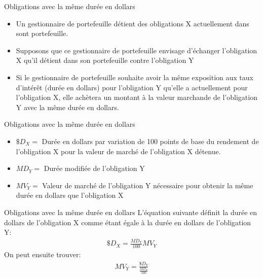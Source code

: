 \documentclass{beamer}
\begin{document}
\begin{frame}{Obligations avec la même durée en dollars}
\begin{itemize}[label=\bullet]
\item Un gestionnaire de portefeuille détient des obligations X actuellement dans sont portefeuille.

\item Supposons que ce gestionnaire de portefeuille envisage d'échanger l'obligation X qu'il détient dans son portefeuille contre l'obligation Y
\item Si le gestionnaire de portefeuille souhaite avoir la même exposition aux taux d'intérêt (durée en dollars) pour l'obligation Y qu'elle a actuellement pour l'obligation X, elle achètera un montant à la valeur marchande de l'obligation Y avec la même durée en dollars.
\end{itemize}

\end{frame}

\begin{frame}{Obligations avec la même durée en dollars}
\begin{itemize}[label=\bullet]
\item $\$D_X=$ Durée en dollars par variation de 100 points de base du rendement de l'obligation X pour la valeur de marché de l'obligation X détenue.
\item $MD_Y=$ Durée modifiée de l'obligation Y
\item $MV_Y=$ Valeur de marché de l'obligation Y nécessaire pour obtenir la même durée en dollars que l'obligation X
\end{itemize}
\end{frame}

\begin{frame}{Obligations avec la même durée en dollars}
L'équation suivante définit la durée en dollars de l'obligation X comme étant égale à la durée en dollars de l'obligation Y:
\begin{align*}
\$D_X=\frac{MD_Y}{100}MV_Y
\end{align*}
On peut ensuite trouver:
\begin{align*}
MV_Y=\frac{\$ D_Y}{\frac{MD_Y}{100}}
\end{align*}
\end{frame}
\end{document}
